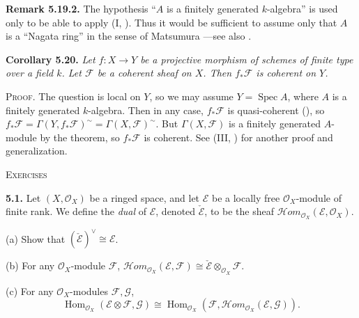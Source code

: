 {\medskip
\noindent\hypertarget{result-II-5.19.2}{}\textbf{Remark 5.19.2.} The hypothesis \textquotedblleft{}$A$ is a finitely generated $k$-algebra\textquotedblright{} is used only to be able to apply (I, ). Thus it would be sufficient to assume only that $A$ is a \textquotedblleft{}Nagata ring\textquotedblright{} in the sense of Matsumura ---see also .

\medskip
\noindent\hypertarget{result-II-5.20}{}\textbf{Corollary 5.20.} \emph{Let $f\colon X\to Y$ be a projective morphism of schemes of finite type over a field $k$. Let $\mathcal F$ be a coherent sheaf on $X$. Then $f_*\mathcal F$ is coherent on $Y$.}

\smallskip
\noindent\textsc{Proof.} The question is local on $Y$, so we may assume $Y=\operatorname{Spec} A$, where $A$ is a finitely generated $k$-algebra. Then in any case, $f_*\mathcal F$ is quasi-coherent (), so $f_*\mathcal F=\Gamma(Y,f_*\mathcal F)^\sim=\Gamma(X,\mathcal F)^\sim$. But $\Gamma(X,\mathcal F)$ is a finitely generated $A$-module by the theorem, so $f_*\mathcal F$ is coherent. See (III, ) for another proof and generalization.

\medskip
\noindent\textsc{Exercises}

\smallskip
\noindent\hypertarget{ex-II-5.1}{}\textbf{5.1.} Let $(X,\mathcal O_X)$ be a ringed space, and let $\mathcal E$ be a locally free $\mathcal O_X$-module of finite rank. We define the \emph{dual} of $\mathcal E$, denoted $\check{\mathcal E}$, to be the sheaf $\mathcal Hom_{\mathcal O_X}(\mathcal E,\mathcal O_X)$.

\noindent\hspace*{1.7em}(a) Show that $(\check{\mathcal E})^\vee\cong\mathcal E$.

\noindent\hspace*{1.7em}(b) For any $\mathcal O_X$-module $\mathcal F$, $\mathcal Hom_{\mathcal O_X}(\mathcal E,\mathcal F)\cong\check{\mathcal E}\otimes_{\mathcal O_X}\mathcal F$.

\noindent\hspace*{1.7em}(c) For any $\mathcal O_X$-modules $\mathcal F,\mathcal G$,
\[
\operatorname{Hom}_{\mathcal O_X}(\mathcal E\otimes\mathcal F,\mathcal G)
\cong\operatorname{Hom}_{\mathcal O_X}(\mathcal F,\mathcal Hom_{\mathcal O_X}(\mathcal E,\mathcal G)).
\]}
